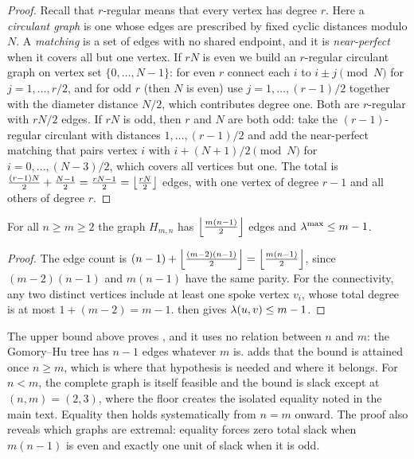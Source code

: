 \begin{proof}
Recall that $r$-regular means that every vertex has degree $r$. Here a
\emph{circulant graph} is one whose edges are prescribed by fixed cyclic
distances modulo $N$. A \emph{matching} is a set of edges with no shared
endpoint, and it is \emph{near-perfect} when it covers all but one vertex.
If $rN$ is even we build an $r$-regular circulant graph on vertex set $\{0, \dots, N-1\}$: for even $r$ connect each $i$ to $i \pm j \pmod N$ for $j = 1, \dots, r/2$, and for odd $r$ (then $N$ is even) use $j = 1, \dots, (r-1)/2$ together with the diameter distance $N/2$, which contributes degree one. Both are $r$-regular with $rN/2$ edges. If $rN$ is odd, then $r$ and $N$ are both odd: take the $(r-1)$-regular circulant with distances $1, \dots, (r-1)/2$ and add the near-perfect matching that pairs vertex $i$ with $i + (N+1)/2 \pmod N$ for $i = 0, \dots, (N-3)/2$, which covers all vertices but one. The total is $\frac{(r-1)N}{2} + \frac{N-1}{2} = \frac{rN-1}{2} = \left\lfloor \frac{rN}{2} \right\rfloor$ edges, with one vertex of degree $r-1$ and all others of degree $r$.
\end{proof}

\begin{theorem}\label{thm:extremal-existence}
For all $n \ge m \ge 2$ the graph $H_{m,n}$ has $\left\lfloor \frac{m(n-1)}{2} \right\rfloor$ edges and $\lambda^{\max} \le m-1$.
\end{theorem}

\begin{proof}
The edge count is $(n-1) + \left\lfloor \frac{(m-2)(n-1)}{2} \right\rfloor = \left\lfloor \frac{m(n-1)}{2} \right\rfloor$, since $(m-2)(n-1)$ and $m(n-1)$ have the same parity. For the connectivity, any two distinct vertices include at least one spoke vertex $v_i$, whose total degree is at most $1 + (m-2) = m-1$.  then gives $\lambda(u,v) \le m-1$.
\end{proof}

The upper bound above proves , and it uses no relation between $n$ and $m$: the Gomory--Hu tree has $n-1$ edges whatever $m$ is.  adds that the bound is attained once $n \ge m$, which is where that hypothesis is needed and where it belongs. For $n<m$, the complete graph is itself feasible and the bound is slack except at $(n,m)=(2,3)$, where the floor creates the isolated equality noted in the main text. Equality then holds systematically from $n=m$ onward. The proof also reveals which graphs are extremal: equality forces zero total slack when $m(n-1)$ is even and exactly one unit of slack when it is odd.

